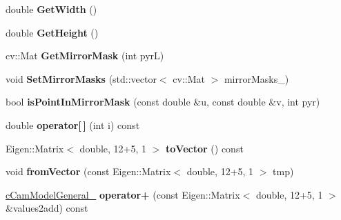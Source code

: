 \begin{DoxyCompactItemize}
\item 
double {\bfseries Get\+Width} ()\hypertarget{classMultiColSLAM_1_1cCamModelGeneral___a5e85acb2b4ba447d3b28f7f2b3a744c0}{}\label{classMultiColSLAM_1_1cCamModelGeneral___a5e85acb2b4ba447d3b28f7f2b3a744c0}

\item 
double {\bfseries Get\+Height} ()\hypertarget{classMultiColSLAM_1_1cCamModelGeneral___ac3dfa532576103cb38515d60c0e59c99}{}\label{classMultiColSLAM_1_1cCamModelGeneral___ac3dfa532576103cb38515d60c0e59c99}

\item 
cv\+::\+Mat {\bfseries Get\+Mirror\+Mask} (int pyrL)\hypertarget{classMultiColSLAM_1_1cCamModelGeneral___a252dfece3e794820e78afa2a6ec77887}{}\label{classMultiColSLAM_1_1cCamModelGeneral___a252dfece3e794820e78afa2a6ec77887}

\item 
void {\bfseries Set\+Mirror\+Masks} (std\+::vector$<$ cv\+::\+Mat $>$ mirror\+Masks\+\_\+)\hypertarget{classMultiColSLAM_1_1cCamModelGeneral___a3ea4d6fd99d2db89c6e9eb1e67f476d9}{}\label{classMultiColSLAM_1_1cCamModelGeneral___a3ea4d6fd99d2db89c6e9eb1e67f476d9}

\item 
bool {\bfseries is\+Point\+In\+Mirror\+Mask} (const double \&u, const double \&v, int pyr)\hypertarget{classMultiColSLAM_1_1cCamModelGeneral___aa1625a0b3a7fb2bd62e7f08a0215d076}{}\label{classMultiColSLAM_1_1cCamModelGeneral___aa1625a0b3a7fb2bd62e7f08a0215d076}

\item 
double {\bfseries operator\mbox{[}$\,$\mbox{]}} (int i) const \hypertarget{classMultiColSLAM_1_1cCamModelGeneral___ad69c9340067db19db86034f11f91eda4}{}\label{classMultiColSLAM_1_1cCamModelGeneral___ad69c9340067db19db86034f11f91eda4}

\item 
Eigen\+::\+Matrix$<$ double, 12+5, 1 $>$ {\bfseries to\+Vector} () const \hypertarget{classMultiColSLAM_1_1cCamModelGeneral___ac83caaf398a3bef3dbad982dfe2bbe9d}{}\label{classMultiColSLAM_1_1cCamModelGeneral___ac83caaf398a3bef3dbad982dfe2bbe9d}

\item 
void {\bfseries from\+Vector} (const Eigen\+::\+Matrix$<$ double, 12+5, 1 $>$ tmp)\hypertarget{classMultiColSLAM_1_1cCamModelGeneral___ad4213dbd3649990edb64ca4cb1e8fe5c}{}\label{classMultiColSLAM_1_1cCamModelGeneral___ad4213dbd3649990edb64ca4cb1e8fe5c}

\item 
\hyperlink{classMultiColSLAM_1_1cCamModelGeneral__}{c\+Cam\+Model\+General\+\_\+} {\bfseries operator+} (const Eigen\+::\+Matrix$<$ double, 12+5, 1 $>$ \&values2add) const \hypertarget{classMultiColSLAM_1_1cCamModelGeneral___ae46a62f84b9f3a1d7b567de9595e9942}{}\label{classMultiColSLAM_1_1cCamModelGeneral___ae46a62f84b9f3a1d7b567de9595e9942}

\end{DoxyCompactItemize}
